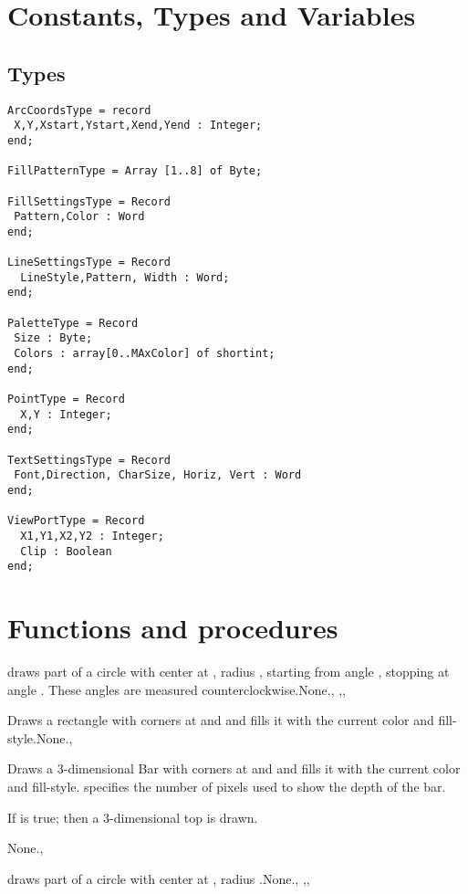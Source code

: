 \section{Constants, Types and Variables}
\subsection{Types}
\begin{verbatim}
ArcCoordsType = record
 X,Y,Xstart,Ystart,Xend,Yend : Integer;
end;

FillPatternType = Array [1..8] of Byte;

FillSettingsType = Record
 Pattern,Color : Word
end;

LineSettingsType = Record
  LineStyle,Pattern, Width : Word;
end;

PaletteType = Record
 Size : Byte;
 Colors : array[0..MAxColor] of shortint;
end;

PointType = Record
  X,Y : Integer;
end;

TextSettingsType = Record
 Font,Direction, CharSize, Horiz, Vert : Word
end;

ViewPortType = Record
  X1,Y1,X2,Y2 : Integer;
  Clip : Boolean
end;
\end{verbatim}

\section{Functions and procedures}
{  draws part of a circle with center at , radius
, starting from angle , stopping at angle .
These  angles are measured
counterclockwise.}{None.}{, 
,, }

{Draws a rectangle with corners at  and  
and fills it with the current color and fill-style.}{None.}{, 
}

{Draws a 3-dimensional Bar  with corners at  and  
and fills it with the current color and fill-style.
 specifies the number of pixels used to show the depth of the
bar.

If  is true; then a 3-dimensional top is drawn.}
{None.}{, }

{  draws part of a circle with center at , radius
.}{None.}{,
,, }

